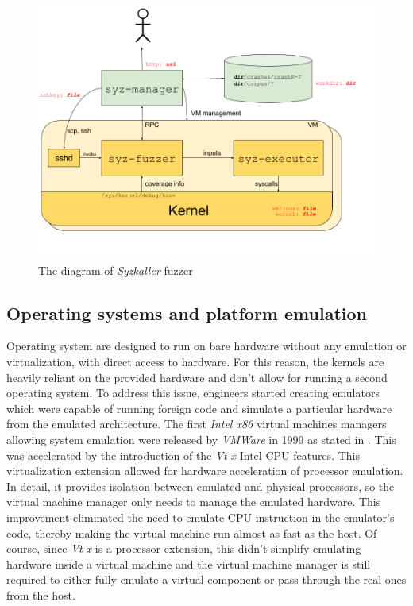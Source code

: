 \begin{figure}
    \centering
    \includegraphics[width=.9\linewidth]{tex/img/syz.png}
    \caption{The diagram of \textit{Syzkaller} fuzzer}
    \label{fig:syz}
\end{figure}

\subsection{Operating systems and platform emulation}
Operating system are designed to run on bare hardware without any emulation or virtualization, with direct access to hardware. For this reason, the kernels are heavily reliant on the provided hardware and don't allow for running a second operating system. To address this issue, engineers started creating emulators which were capable of running foreign code and simulate a particular hardware from the emulated architecture. The first \textit{Intel x86} virtual machines managers allowing system emulation were released by \textit{VMWare} in 1999 as stated in \cite{vms}. This was accelerated by the introduction of the \textit{Vt-x} Intel CPU features. This virtualization extension allowed for hardware acceleration of processor emulation. In detail, it provides isolation between emulated and physical processors, so the virtual machine manager only needs to manage the emulated hardware. This improvement eliminated the need to emulate CPU instruction in the emulator's code, thereby making the virtual machine run almost as fast as the host. Of course, since \textit{Vt-x} is a processor extension, this didn't simplify emulating hardware inside a virtual machine and the virtual machine manager is still required to either fully emulate a virtual component or pass-through the real ones from the host. 

